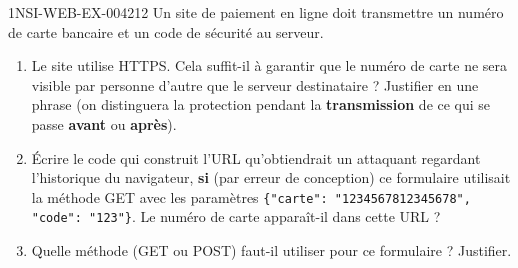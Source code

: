 \begin{exercice}{1NSI-WEB-EX-004}{2}{12}
Un site de paiement en ligne doit transmettre un numéro de carte bancaire et un code de
sécurité au serveur.
\begin{enumerate}
  \item Le site utilise HTTPS. Cela suffit-il à garantir que le numéro de carte ne sera visible par personne d'autre que le serveur destinataire ? Justifier en une phrase (on distinguera la protection pendant la \textbf{transmission} de ce qui se passe \textbf{avant} ou \textbf{après}).
  \item Écrire le code qui construit l'URL qu'obtiendrait un attaquant regardant l'historique du navigateur, \textbf{si} (par erreur de conception) ce formulaire utilisait la méthode GET avec les paramètres \lstinline|{"carte": "1234567812345678", "code": "123"}|. Le numéro de carte apparaît-il dans cette URL ?
  \item Quelle méthode (GET ou POST) faut-il utiliser pour ce formulaire ? Justifier.
\end{enumerate}
\end{exercice}
